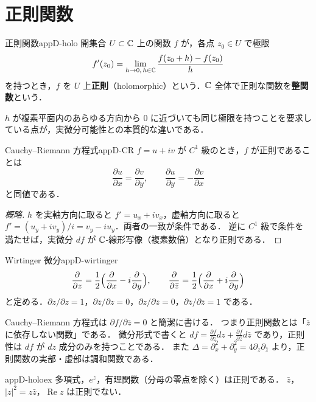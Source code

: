 \section{正則関数}

\begin{mydef}{正則関数}{appD-holo}
開集合 $U\subset\mathbb{C}$ 上の関数 $f$ が，各点 $z_0\in U$ で極限
\[
f'(z_0)=\lim_{h\to0,\,h\in\mathbb{C}}\frac{f(z_0+h)-f(z_0)}{h}
\]
を持つとき，$f$ を $U$ 上\textbf{正則}（holomorphic）という．$\mathbb{C}$ 全体で正則な関数を\textbf{整関数}という．
\end{mydef}

$h$ が複素平面内のあらゆる方向から $0$ に近づいても同じ極限を持つことを要求している点が，実微分可能性との本質的な違いである．

\begin{mythm}{Cauchy--Riemann 方程式}{appD-CR}
$f=u+iv$ が $C^1$ 級のとき，$f$ が正則であることは
\[
\frac{\partial u}{\partial x}=\frac{\partial v}{\partial y},\qquad
\frac{\partial u}{\partial y}=-\frac{\partial v}{\partial x}
\]
と同値である．
\end{mythm}
\begin{proof}[概略]
$h$ を実軸方向に取ると $f'=u_x+iv_x$，虚軸方向に取ると $f'=(u_y+iv_y)/i=v_y-iu_y$．両者の一致が条件である．
逆に $C^1$ 級で条件を満たせば，実微分 $df$ が $\mathbb{C}$-線形写像（複素数倍）となり正則である．
\end{proof}

\begin{mydef}{Wirtinger 微分}{appD-wirtinger}
\[
\frac{\partial}{\partial z}=\frac12\Bigl(\frac{\partial}{\partial x}-i\frac{\partial}{\partial y}\Bigr),\qquad
\frac{\partial}{\partial\bar z}=\frac12\Bigl(\frac{\partial}{\partial x}+i\frac{\partial}{\partial y}\Bigr)
\]
と定める．$\partial z/\partial z=1$，$\partial\bar z/\partial z=0$，$\partial z/\partial\bar z=0$，$\partial\bar z/\partial\bar z=1$ である．
\end{mydef}

Cauchy--Riemann 方程式は $\partial f/\partial\bar z=0$ と簡潔に書ける．
つまり正則関数とは「$\bar z$ に依存しない関数」である．
微分形式で書くと $df=\frac{\partial f}{\partial z}dz+\frac{\partial f}{\partial\bar z}d\bar z$ であり，正則性は $df$ が $dz$ 成分のみを持つことである．
また $\Delta=\partial_x^2+\partial_y^2=4\partial_z\partial_{\bar z}$ より，正則関数の実部・虚部は調和関数である．

\begin{myex}{}{appD-holoex}
多項式，$e^z$，有理関数（分母の零点を除く）は正則である．
$\bar z$，$|z|^2=z\bar z$，$\operatorname{Re}z$ は正則でない．
\end{myex}

